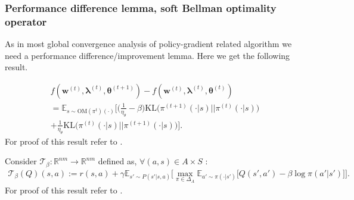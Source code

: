 \subsubsection{Performance difference lemma, soft Bellman optimality operator}
As in most global convergence analysis of policy-gradient related algorithm we need a performance difference/improvement lemma. Here we get the following result.
\begin{lemma}
    \label{lem:performance_improvement}
    \begin{align*}
    f(\bm{w}^{(t)},\bm{\lambda}^{(t)},\bm{\theta}^{(t+1)}) 
    - f(\bm{w}^{(t)},\bm{\lambda}^{(t)},\bm{\theta}^{(t)}) \\
   = \mathbb{E}_{s \sim \text{OM}(\pi^{t})(\cdot)}
   \Bigg[ 
        \Big(
            \frac{1}{\eta_\theta} - \beta
        \Big)\text{KL}
        \Big(
            \pi^{(t+1)}(\cdot|s)
            \Big|\Big|
            \pi^{(t)}(\cdot|s)
        \Big)
        \\+ \frac{1}{\eta_\theta}
        \text{KL}
        \Big(
            \pi^{(t)}(\cdot|s)
            \Big|\Big|
            \pi^{(t+1)}(\cdot|s)
        \Big)
    \Bigg].
    \end{align*}
    For proof of this result refer to \cite{Cen2021}.
\end{lemma}

\begin{definition}
    \label{def:soft_bellman}
    Consider $\mathcal{T}_\beta:\mathbb{R}^{nm} \rightarrow \mathbb{R}^{nm}$ defined as, $\forall (a,s) \in A \times S$ :
    \begin{align*}
        \mathcal{T}_\beta(Q)(s,a) := r(s,a) 
        + \gamma \mathbb{E}_{s'\sim P(s'|s,a)} \Bigg[
            \max_{\pi \in \Delta_A}
            \mathbb{E}_{a'\sim \pi(\cdot|s')} \Big[
                Q(s',a') - \beta \log \pi(a'|s')
            \Big]
        \Bigg].
    \end{align*}
    For proof of this result refer to \cite{Cen2021}.
\end{definition}

